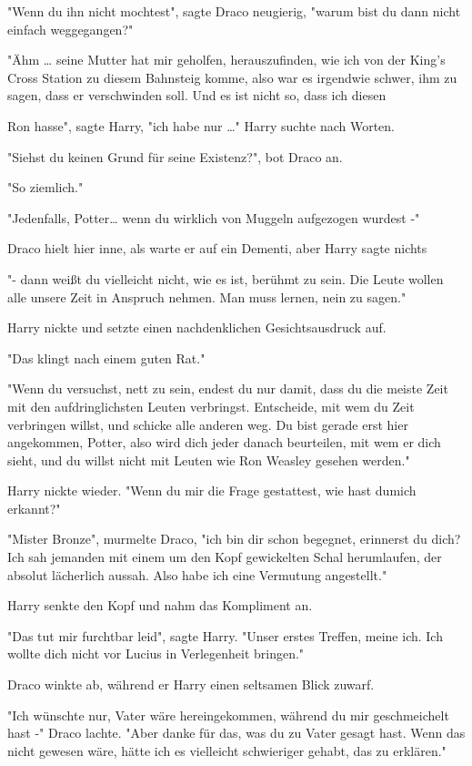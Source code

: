 {"Wenn du ihn nicht mochtest", sagte Draco neugierig, "warum bist du dann nicht einfach weggegangen?"

"Ähm … seine Mutter hat mir geholfen, herauszufinden, wie ich von der King's Cross Station zu diesem Bahnsteig komme, also war es irgendwie schwer, ihm zu sagen, dass er verschwinden soll. Und es ist nicht so, dass ich diesen

Ron hasse", sagte Harry, "ich habe nur …" Harry suchte nach Worten.

"Siehst du keinen Grund für seine Existenz?", bot Draco an.

"So ziemlich."

"Jedenfalls, Potter… wenn du wirklich von Muggeln aufgezogen wurdest -"

Draco hielt hier inne, als warte er auf ein Dementi, aber Harry sagte nichts

"- dann weißt du vielleicht nicht, wie es ist, berühmt zu sein. Die Leute wollen alle unsere Zeit in Anspruch nehmen. Man muss lernen, nein zu sagen."

Harry nickte und setzte einen nachdenklichen Gesichtsausdruck auf.

"Das klingt nach einem guten Rat."

"Wenn du versuchst, nett zu sein, endest du nur damit, dass du die meiste Zeit mit den aufdringlichsten Leuten verbringst. Entscheide, mit wem du Zeit verbringen willst, und schicke alle anderen weg. Du bist gerade erst hier angekommen, Potter, also wird dich jeder danach beurteilen, mit wem er dich sieht, und du willst nicht mit Leuten wie Ron Weasley gesehen werden."

Harry nickte wieder. "Wenn du mir die Frage gestattest, wie hast dumich erkannt?"

"Mister Bronze", murmelte Draco, "ich bin dir schon begegnet, erinnerst du dich? Ich sah jemanden mit einem um den Kopf gewickelten Schal herumlaufen, der absolut lächerlich aussah. Also habe ich eine Vermutung angestellt."

Harry senkte den Kopf und nahm das Kompliment an.

"Das tut mir furchtbar leid", sagte Harry. "Unser erstes Treffen, meine ich. Ich wollte dich nicht vor Lucius in Verlegenheit bringen."

Draco winkte ab, während er Harry einen seltsamen Blick zuwarf.

"Ich wünschte nur, Vater wäre hereingekommen, während du mir geschmeichelt hast -" Draco lachte. "Aber danke für das, was du zu Vater gesagt hast. Wenn das nicht gewesen wäre, hätte ich es vielleicht schwieriger gehabt, das zu erklären."

}
